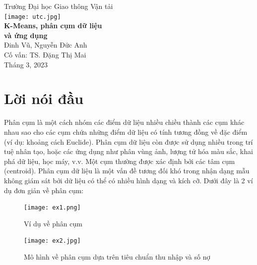 \documentclass{article}
\begin{document}
    \begin{titlepage}
        \begin{center}
           \Large{Trường Đại học Giao thông Vận tải} \\
            [1cm]
            \texttt{[image: utc.jpg]} \\
            [4cm]
            \Huge{\bfseries K-Means, phân cụm dữ liệu \\và ứng dụng} \\
            [1.25cm]
            \Large{Đinh Vũ, Nguyễn Đức Anh} \\
            \Large{Cố vấn: TS. Đặng Thị Mai} \\
            \vspace*{\fill}
            \Large{Tháng 3, 2023}
        \end{center}
    \end{titlepage}

    \tableofcontents
    \thispagestyle{empty}
    \clearpage
    \setcounter{page}{1}
    
    \section{Lời nói đầu}
    \label{sec:intro}
    Phân cụm là một cách nhóm các điểm dữ liệu nhiều chiều thành các cụm khác nhau sao cho các cụm chứa những điểm dữ liệu có tính tương đồng về đặc điểm (ví dụ: khoảng cách Euclide). Phân cụm dữ liệu còn được sử dụng nhiều trong trí tuệ nhân tạo, hoặc các ứng dụng như phân vùng ảnh, lượng tử hóa màu sắc, khai phá dữ liệu, học máy, v.v. Một cụm thường được xác định bởi các tâm cụm (centroid). Phân cụm dữ liệu là một vấn đề tương đối khó trong nhận dạng mẫu không giám sát bởi dữ liệu có thể có nhiều hình dạng và kích cỡ. Dưới đây là 2 ví dụ đơn giản về phân cụm:

    \begin{figure}[H]
        \centering            \texttt{[image: ex1.png]} \\
        \caption{Ví dụ về phân cụm}
        \label{fig:clustering_example1}
    \end{figure}

    \begin{figure}[H]
        \centering
        \texttt{[image: ex2.jpg]} \\
        \caption{Mô hình về phân cụm dựa trên tiêu chuẩn thu nhập và số nợ}
        \label{fig:clustering_example2}
    \end{figure}
\end{document}
